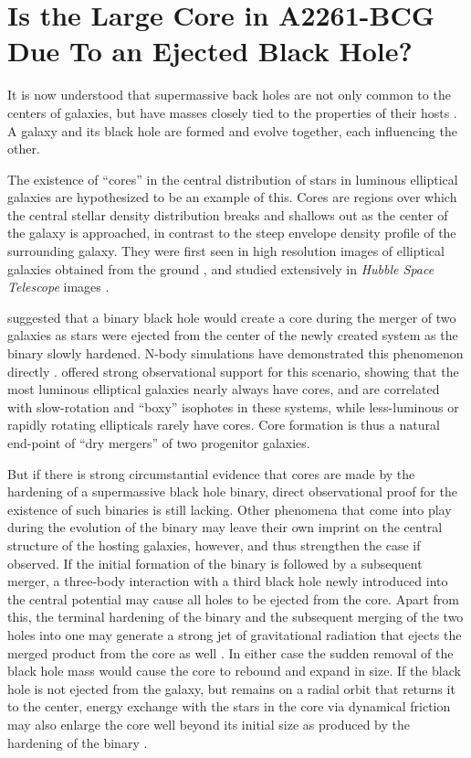 \documentclass[useAMS,usenatbib]{emulateapj}
\begin{document}



\section{Is the Large Core in A2261-BCG Due To an Ejected Black Hole?}

It is now understood that supermassive back holes are not only common
to the centers of galaxies, but have masses closely tied to the
properties of their hosts \citep{mag,msig,ferraresemerrittmsig}.  A galaxy and its black hole
are formed and evolve together, each influencing the other.

The existence of ``cores'' in the central distribution of stars
in luminous elliptical galaxies are hypothesized to be an example of this.
Cores are regions over which the central stellar density distribution breaks
and shallows out as the center of the galaxy is approached,
in contrast to the steep envelope density profile of the surrounding galaxy.
They were first seen in high resolution images of elliptical
galaxies obtained from the ground \citep{l85, k85},
and studied extensively in {\it Hubble Space Telescope} images
\citet{f94,l95,laine03,l05}.

\citet{begelman80} suggested that a binary black hole would create a core during
the merger of two galaxies as stars were ejected from the center of
the newly created system as the binary slowly hardened.
N-body simulations have demonstrated this
phenomenon directly \citep{ebisuzaki91, makino97, milomerritt01}.
\citet{faber97} offered strong observational support for this scenario,
showing that the most luminous elliptical galaxies nearly always have cores,
and are correlated with slow-rotation and ``boxy'' isophotes in these systems,
while less-luminous or rapidly rotating ellipticals rarely have cores.
Core formation is thus a natural end-point of
``dry mergers'' of two progenitor galaxies.

But if there is strong circumstantial evidence that cores are made by the
hardening of a supermassive black hole binary,
direct observational proof for the existence of such binaries is still lacking.
Other phenomena that come into play during the evolution of the binary
may leave their own imprint on the central structure
of the hosting galaxies, however, and thus strengthen the case if observed.
If the initial formation of the binary is followed by a subsequent merger,
a three-body interaction with a third black hole newly introduced
into the central potential may cause all holes to be ejected from the core.
Apart from this, the terminal hardening of the binary and the subsequent
merging of the two holes into one may generate a strong jet of gravitational
radiation that ejects the merged product from the core as well \citep{recoilfx1}.
In either case the sudden removal of the black hole mass would
cause the core to rebound and expand in size.  If the black hole is
not ejected from the galaxy, but remains on a radial orbit that
returns it to the center, energy exchange with the stars in the core
via dynamical friction may also enlarge the core well beyond its initial
size as produced by the hardening of the binary \citep{bk04, m04}.
\end{document}
